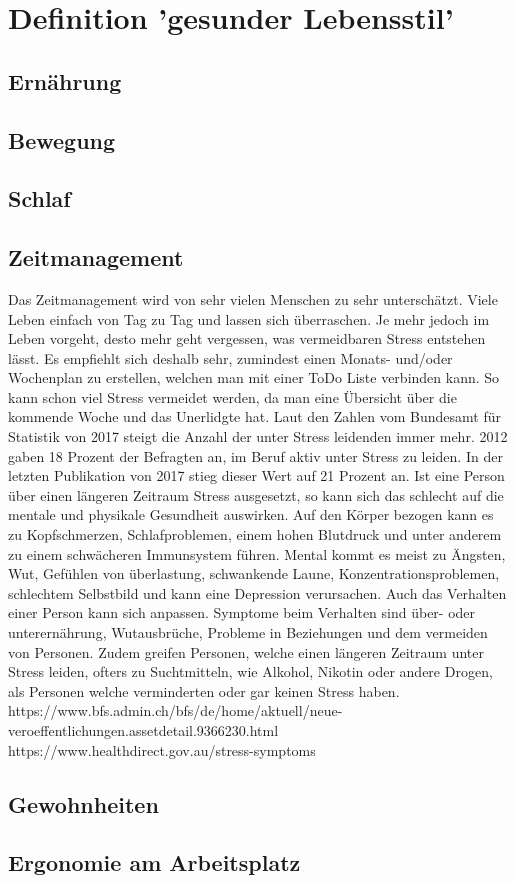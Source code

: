 \chapter{Definition 'gesunder Lebensstil'}
\section{Ernährung}
\lipsum[4-8][32-64]
\section{Bewegung}
\lipsum[4-8][32-64]
\section{Schlaf}
\lipsum[4-8][32-64]
\section{Zeitmanagement}
Das Zeitmanagement wird von sehr vielen Menschen zu sehr unterschätzt. Viele Leben einfach von Tag zu Tag und lassen sich überraschen. Je mehr jedoch im Leben vorgeht, desto mehr geht vergessen, was vermeidbaren Stress entstehen lässt. 
\newline
Es empfiehlt sich deshalb sehr, zumindest einen Monats- und/oder Wochenplan zu erstellen, welchen man mit einer ToDo Liste verbinden kann. So kann schon viel Stress vermeidet werden, da man eine Übersicht über die kommende Woche und das Unerlidgte hat. 
\newline
Laut den Zahlen vom Bundesamt für Statistik von 2017 steigt die Anzahl der unter Stress leidenden immer mehr. 2012 gaben 18 Prozent der Befragten an, im Beruf aktiv unter Stress zu leiden. In der letzten Publikation von 2017 stieg dieser Wert auf 21 Prozent an. Ist eine Person über einen längeren Zeitraum Stress ausgesetzt, so kann sich das schlecht auf die mentale und physikale Gesundheit auswirken. Auf den Körper bezogen kann es zu Kopfschmerzen, Schlafproblemen, einem hohen Blutdruck und unter anderem zu einem schwächeren Immunsystem führen. Mental kommt es meist zu Ängsten, Wut, Gefühlen von überlastung, schwankende Laune, Konzentrationsproblemen, schlechtem Selbstbild und kann eine Depression verursachen. Auch das Verhalten einer Person kann sich anpassen. Symptome beim Verhalten sind über- oder unterernährung, Wutausbrüche, Probleme in Beziehungen und dem vermeiden von Personen. Zudem greifen Personen, welche einen längeren Zeitraum unter Stress leiden, ofters zu Suchtmitteln, wie Alkohol, Nikotin oder andere Drogen, als Personen welche verminderten oder gar keinen Stress haben.
\newline
https://www.bfs.admin.ch/bfs/de/home/aktuell/neue-veroeffentlichungen.assetdetail.9366230.html
\newline
https://www.healthdirect.gov.au/stress-symptoms
\section{Gewohnheiten}
\lipsum[4-8][32-64]
\section{Ergonomie am Arbeitsplatz}
\lipsum[4-8][32-64]